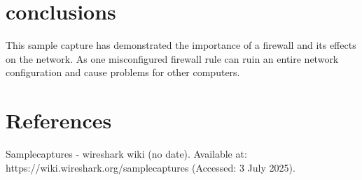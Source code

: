 \documentclass{article}
\begin{document}
\section{conclusions}

This sample capture has demonstrated the importance of a firewall and its effects on the network. As one misconfigured firewall rule can ruin an entire network configuration and cause problems for other computers.

\section{References}

Samplecaptures - wireshark wiki (no date). Available at: https://wiki.wireshark.org/samplecaptures (Accessed: 3 July 2025).
\end{document}
